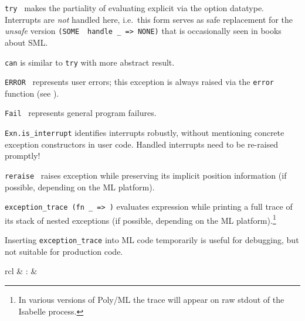 \begin{isabellebody}
\begin{isamarkuptext}
\begin{description}
  \item \verb|try|~ makes the partiality of evaluating
   explicit via the option datatype.  Interrupts are
  \emph{not} handled here, i.e.\ this form serves as safe replacement
  for the \emph{unsafe} version \verb|(SOME|~~\verb|handle _ => NONE)| that is occasionally seen in
  books about SML.

  \item \verb|can| is similar to \verb|try| with more abstract result.

  \item \verb|ERROR|~ represents user errors; this
  exception is always raised via the \verb|error| function (see
  ).

  \item \verb|Fail|~ represents general program failures.

  \item \verb|Exn.is_interrupt| identifies interrupts robustly, without
  mentioning concrete exception constructors in user code.  Handled
  interrupts need to be re-raised promptly!

  \item \verb|reraise|~ raises exception 
  while preserving its implicit position information (if possible,
  depending on the ML platform).

  \item \verb|exception_trace|~\verb|(fn _ =>|~\verb|)| evaluates expression  while printing
  a full trace of its stack of nested exceptions (if possible,
  depending on the ML platform).\footnote{In various versions of
  Poly/ML the trace will appear on raw stdout of the Isabelle
  process.}

  Inserting \verb|exception_trace| into ML code temporarily is useful
  for debugging, but not suitable for production code.

  \end{description}%
\end{isamarkuptext}%
\isamarkuptrue%
%
\endisatagmlref
{\isafoldmlref}%
%
\isadelimmlref
%
\endisadelimmlref
%
\isadelimmlantiq
%
\endisadelimmlantiq
%
\isatagmlantiq
%
\begin{isamarkuptext}%
\begin{matharray}{rcl}
  \hypertarget{ML antiquotation.assert}{\hyperlink{ML antiquotation.assert}{\mbox{}}} & : &  \\
  \end{matharray}


\end{isamarkuptext}
\end{isabellebody}
